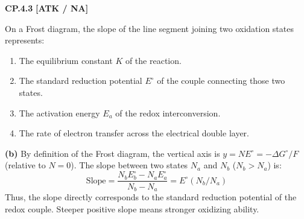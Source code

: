\begin{problembox}
\textbf{CP.4.3} \hfill \textbf{[ATK / NA]}

On a Frost diagram, the slope of the line segment joining two oxidation states represents:
\begin{enumerate}[label=(\alph*)]
    \item The equilibrium constant $K$ of the reaction.
    \item The standard reduction potential $E^\circ$ of the couple connecting those two states.
    \item The activation energy $E_a$ of the redox interconversion.
    \item The rate of electron transfer across the electrical double layer.
\end{enumerate}
\end{problembox}
\begin{solution}
\textbf{(b)}
By definition of the Frost diagram, the vertical axis is $y = N E^\circ = -\Delta G^\circ / F$ (relative to $N=0$).
The slope between two states $N_a$ and $N_b$ ($N_b > N_a$) is:
\begin{equation*}
    \text{Slope} = \frac{N_b E_b^\circ - N_a E_a^\circ}{N_b - N_a} = E^\circ(N_b / N_a)
\end{equation*}
Thus, the slope directly corresponds to the standard reduction potential of the redox couple. Steeper positive slope means stronger oxidizing ability.
\end{solution}
